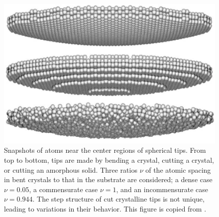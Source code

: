 \documentclass[twoside,english]{uiofysmaster}
\begin{document}
\begin{multicols}{2}
\begin{figure}[H]
	\centering
	\captionsetup{width=\linewidth}
	\vspace*{17mm}
	\includegraphics[width=0.9\linewidth]{figures/Robbins/surfaceSrtucture}
	\vspace*{16.3mm}
	\caption{Snapshots of atoms near the center regions of spherical tips. From top to bottom, tips are made by bending a crystal, cutting a crystal, or cutting an amorphous solid. Three ratios $\nu$ of the atomic spacing in bent crystals to that in the substrate are considered; a dense case $\nu=0.05$, a commensurate case $\nu=1$, and an incommensurate case $\nu=0.944$. The step structure of cut crystalline tips is not unique, leading to variations in their behavior.
		This figure is copied from \cite{RobbinsSingleAsperity}.}
	\label{fig:robbinsSurfaces}
\end{figure}


\end{multicols}
\end{document}
